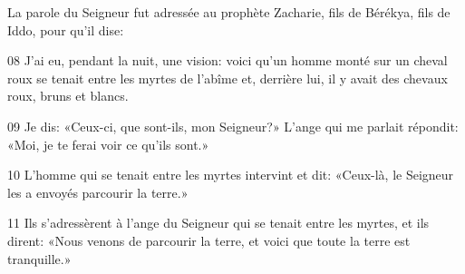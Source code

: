 La parole du Seigneur fut adressée au prophète Zacharie, fils de Bérékya, fils de Iddo, pour qu’il dise:

08 J’ai eu, pendant la nuit, une vision: voici qu’un homme monté sur un cheval roux se tenait entre les myrtes de l’abîme et, derrière lui, il y avait des chevaux roux, bruns et blancs.

09 Je dis: «Ceux-ci, que sont-ils, mon Seigneur?» L’ange qui me parlait répondit: «Moi, je te ferai voir ce qu’ils sont.»

10 L’homme qui se tenait entre les myrtes intervint et dit: «Ceux-là, le Seigneur les a envoyés parcourir la terre.»

11 Ils s’adressèrent à l’ange du Seigneur qui se tenait entre les myrtes, et ils dirent: «Nous venons de parcourir la terre, et voici que toute la terre est tranquille.»